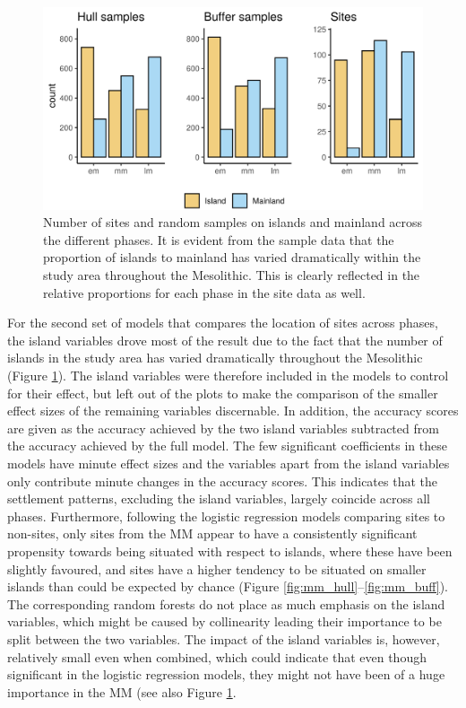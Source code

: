 \documentclass[12pt, a4paper]{article}
\begin{document}
\begin{figure}[ht]
	\centering
	\includegraphics[width = 0.75\linewidth]{island_hist.png}
	\caption{Number of sites and random samples on islands and mainland across the different phases. It is evident from the sample data that the proportion of islands to mainland has varied dramatically within the study area throughout the Mesolithic. This is clearly reflected in the relative proportions for each phase in the site data as well.}
	\label{fig:island_hist}
\end{figure}

For the second set of models that compares the location of sites across phases, the island variables drove most of the result due to the fact that the number of islands in the study area has varied dramatically throughout the Mesolithic (Figure \ref{fig:island_hist}). The island variables were therefore included in the models to control for their effect, but left out of the plots to make the comparison of the smaller effect sizes of the remaining variables discernable. In addition, the accuracy scores are given as the accuracy achieved by the two island variables subtracted from the accuracy achieved by the full model. The few significant coefficients in these models have minute effect sizes and the variables apart from the island variables only contribute minute changes in the accuracy scores. This indicates that the settlement patterns, excluding the island variables, largely coincide across all phases. Furthermore, following the logistic regression models comparing sites to non-sites, only sites from the MM appear to have a consistently significant propensity towards being situated with respect to islands, where these have been slightly favoured, and sites have a higher tendency to be situated on smaller islands than could be expected by chance (Figure \ref{fig:mm_hull}--\ref{fig:mm_buff}). The corresponding random forests do not place as much emphasis on the island variables, which might be caused by collinearity leading their importance to be split between the two variables. The impact of the island variables is, however, relatively small even when combined, which could indicate that even though significant in the logistic regression models, they might not have been of a huge importance in the MM (see also Figure \ref{fig:island_hist}.
\end{document}
